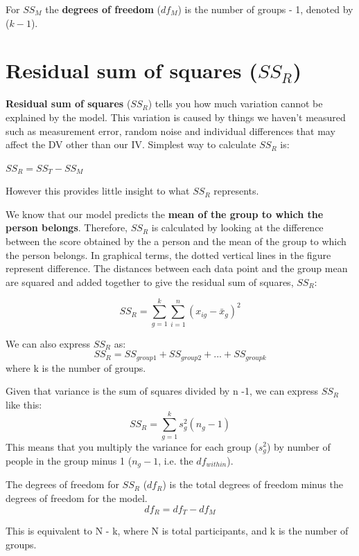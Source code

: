 For $SS_M$ the \textbf{degrees of freedom} ($df_M$) is the number of groups - 1, denoted by ($k-1$). 

\section{Residual sum of squares ($SS_R$)}
\textbf{Residual sum of squares} ($SS_R$) tells you how much variation cannot be explained by the model. This variation is caused by things we haven't measured such as measurement error, random noise and individual differences that may affect the DV other than our IV. 
Simplest way to calculate $SS_R$ is: 
\begin{center}
$SS_R = SS_T - SS_M$
\end{center}
However this provides little insight to what $SS_R$ represents.

We know that our model predicts the \textbf{mean of the group to which the person belongs}. Therefore, $SS_R$ is calculated by looking at the difference between the score obtained by the a person and the mean of the group to which the person belongs. In graphical terms, the dotted vertical lines in the figure represent difference. The distances between each data point and the group mean are squared and added together to give the residual sum of squares, $SS_R$:

\begin{equation}
SS_R = \sum^k_{g=1} \sum^n_{i=1} (x_{ig}-\bar{x}_g)^2
\end{equation}

We can also express $SS_R$ as:
\begin{equation}
SS_R = SS_{group 1} + SS_{group 2} + ... + SS_{group k}
\end{equation}
where k is the number of groups. 

Given that variance is the sum of squares divided by n -1, we can express $SS_R$ like this:
\begin{equation}
SS_R = \sum^k_{g=1} s^2_g (n_g - 1)
\end{equation}
This means that you multiply the variance for each group ($s^2_g$) by number of people in the group minus 1 ($n_g -1$, i.e. the $df_{within}$).

The degrees of freedom for $SS_R$ ($df_R$) is the total degrees of freedom minus the degrees of freedom for the model.
\begin{equation}
df_R = df_T - df_M
\end{equation}

This is equivalent to N - k, where N is total participants, and k is the number of groups. 

